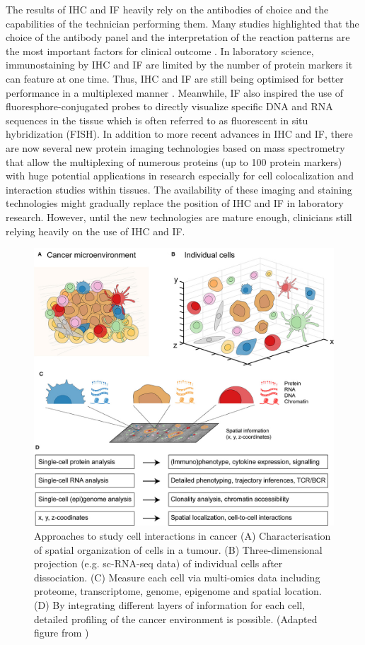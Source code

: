 The results of IHC and IF heavily rely on the antibodies of choice and the capabilities of the technician performing them. Many studies highlighted that the choice of the antibody panel and the interpretation of the reaction patterns are the most important factors for  clinical outcome \cite{de2010immunohistochemistry, jensen1997immunohistochemistry}. In laboratory science, immunostaining by IHC and IF are limited by the number of protein markers it can feature at one time. Thus, IHC and IF are still being optimised for better performance in a multiplexed manner \cite{joshi2017immunofluorescence}. Meanwhile, IF also inspired the use of fluoresphore-conjugated probes to directly visualize specific DNA and RNA sequences in the tissue which is often referred to as fluorescent in situ hybridization (FISH). In addition to more recent advances in IHC and IF, there are now several new protein imaging technologies based on mass spectrometry that allow the multiplexing of numerous proteins (up to 100 protein markers) with huge potential applications in research especially for cell colocalization and interaction studies within tissues. The availability of these imaging and staining technologies might gradually replace the position of IHC and IF in laboratory research. However, until the new technologies are mature enough, clinicians still relying heavily on the use of IHC and IF. 

\begin{figure}[hbt]
    \centering
    \includegraphics[width=0.7\columnwidth]{Chapter1/Figures/figure_1.jpeg}
    \caption{Approaches to study cell interactions in cancer (A) Characterisation of spatial organization of cells in a tumour. (B) Three-dimensional projection (e.g. sc-RNA-seq data) of individual cells after dissociation. (C) Measure each cell via multi-omics data including proteome, transcriptome, genome, epigenome and spatial location. (D) By integrating different layers of information for each cell, detailed profiling of the cancer environment is possible. (Adapted figure from \cite{de2020unraveling})}
    \label{fig:multimodal_approach_cci}
\end{figure}

